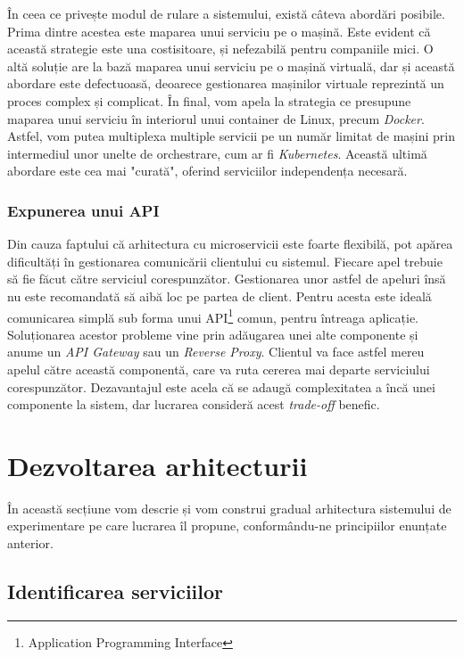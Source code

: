 În ceea ce privește modul de rulare a sistemului, există câteva abordări posibile. Prima dintre acestea este maparea unui serviciu pe o mașină. Este evident că această strategie este una costisitoare, și nefezabilă pentru companiile mici. O altă soluție are la bază maparea unui serviciu pe o mașină virtuală, dar și această abordare este defectuoasă, deoarece gestionarea mașinilor virtuale reprezintă un proces complex și complicat. În final, vom apela la strategia ce presupune maparea unui serviciu în interiorul unui container de Linux, precum \textit{Docker}. Astfel, vom putea multiplexa multiple servicii pe un număr limitat de mașini prin intermediul unor unelte de orchestrare, cum ar fi \textit{Kubernetes}. Această ultimă abordare este cea mai "curată", oferind serviciilor independența necesară.

\subsubsection{Expunerea unui API}

Din cauza faptului că arhitectura cu microservicii este foarte flexibilă, pot apărea dificultăți în gestionarea comunicării clientului cu sistemul. Fiecare apel trebuie să fie făcut către serviciul corespunzător. Gestionarea unor astfel de apeluri însă nu este recomandată să aibă loc pe partea de client.  Pentru acesta este ideală comunicarea simplă sub forma unui API\footnote{Application Programming Interface} comun, pentru întreaga aplicație. Soluționarea acestor probleme vine prin adăugarea unei alte componente și anume un \textit{API Gateway} sau un \textit{Reverse Proxy}. Clientul va face astfel mereu apelul către această componentă, care va ruta cererea mai departe serviciului corespunzător. Dezavantajul este acela că se adaugă complexitatea a încă unei componente la sistem, dar lucrarea consideră acest \textit{trade-off} benefic. 

\section{Dezvoltarea arhitecturii}

În această secțiune vom descrie și vom construi gradual arhitectura sistemului de experimentare pe care lucrarea îl propune, conformându-ne principiilor enunțate anterior.

\subsection{Identificarea serviciilor}

